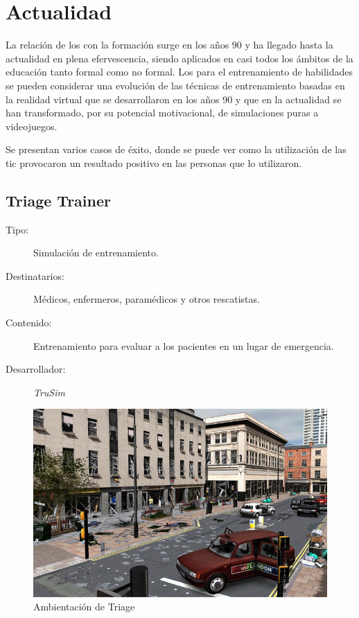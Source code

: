 \section{Actualidad}
\label{sec:tics_ACTUALIDAD}

La relación de los  con la formación surge en los años $90$ y ha llegado hasta la
actualidad en plena efervescencia, siendo aplicados en casi todos los ámbitos de
la educación tanto formal como no formal. Los  para el entrenamiento de habilidades se pueden
considerar una evolución de las técnicas de entrenamiento basadas en la realidad
virtual que se desarrollaron en los años 90 y que en la actualidad se han
transformado, por su potencial motivacional, de simulaciones puras a
videojuegos\cite{videojuegos:gonzaleztardon}.


Se presentan varios casos de éxito, donde se puede ver como la utilización de
las \Gls{tic} provocaron un resultado positivo en las personas que lo
utilizaron.

\subsection{Triage Trainer}
	

\begin{description}
\item[Tipo:] Simulación de entrenamiento.
\item[Destinatarios:] Médicos, enfermeros, paramédicos y otros rescatistas.
\item[Contenido:] Entrenamiento para evaluar a los pacientes en un lugar de
    emergencia.
\item[Desarrollador:] \emph{TruSim}
\end{description}

\begin{figure}[h!] 
\centering 
\includegraphics[scale=0.5]{tics/images/triage.png}
\caption{Ambientación de Triage}
\label{fig:triage}
\end{figure}


